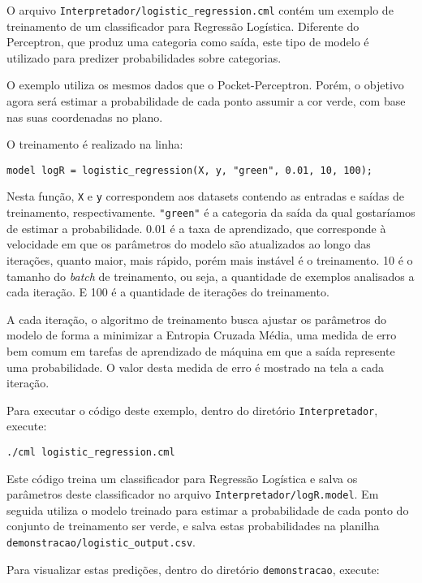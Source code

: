 \documentclass[12pt]{article}
\begin{document}
O arquivo \texttt{Interpretador/logistic\_regression.cml} contém um exemplo de treinamento de um classificador para Regressão Logística. Diferente do Perceptron, que produz uma categoria como saída, este tipo de modelo é utilizado para predizer probabilidades sobre categorias.

O exemplo utiliza os mesmos dados que o Pocket-Perceptron. Porém, o objetivo agora será estimar a probabilidade de cada ponto assumir a cor verde, com base nas suas coordenadas no plano.

O treinamento é realizado na linha:

\begin{verbatim}
model logR = logistic_regression(X, y, "green", 0.01, 10, 100);
\end{verbatim}

Nesta função, \texttt{X} e \texttt{y} correspondem aos datasets contendo as entradas e saídas de treinamento, respectivamente. \texttt{"green"} é a categoria da saída da qual gostaríamos de estimar a probabilidade. 0.01 é a taxa de aprendizado, que corresponde à velocidade em que os parâmetros do modelo são atualizados ao longo das iterações, quanto maior, mais rápido, porém mais instável é o treinamento. 10 é o tamanho do \textit{batch} de treinamento, ou seja, a quantidade de exemplos analisados a cada iteração. E 100 é a quantidade de iterações do treinamento.

A cada iteração, o algoritmo de treinamento busca ajustar os parâmetros do modelo de forma a minimizar a Entropia Cruzada Média, uma medida de erro bem comum em tarefas de aprendizado de máquina em que a saída represente uma probabilidade. O valor desta medida de erro é mostrado na tela a cada iteração.

Para executar o código deste exemplo, dentro do diretório \texttt{Interpretador}, execute:

\begin{verbatim}
./cml logistic_regression.cml
\end{verbatim}

Este código treina um classificador para Regressão Logística e salva os parâmetros deste classificador no arquivo \texttt{Interpretador/logR.model}. Em seguida utiliza o modelo treinado para estimar a probabilidade de cada ponto do conjunto de treinamento ser verde, e salva estas probabilidades na planilha \texttt{demonstracao/logistic\_output.csv}.

Para visualizar estas predições, dentro do diretório \texttt{demonstracao}, execute:
\end{document}
